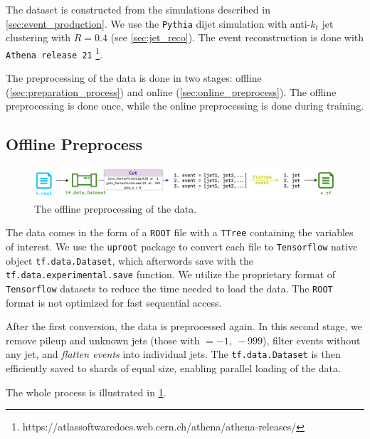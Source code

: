 The dataset is constructed from the \MC simulations described in \cref{sec:event_production}.
We use the \texttt{Pythia} dijet \MC simulation with anti-$k_t$ jet clustering with $R = 0.4$ (see \cref{sec:jet_reco}). 
The event reconstruction is done with \texttt{Athena release 21} \footnote{https://atlassoftwaredocs.web.cern.ch/athena/athena-releases/}.

The preprocessing of the data is done in two stages: offline (\cref{sec:preparation_process}) and online (\cref{sec:online_preprocess}).
The offline preprocessing is done once, while the online preprocessing is done during training.

\subsection{Offline Preprocess}
\begin{figure}[!ht]
    \centering
    \includegraphics[width=1.\textwidth]{src/diagrams/data_prep_off.png}
    \caption{The offline preprocessing of the data.}
    \label{fig:data_prep_off}
\end{figure}
\label{sec:preparation_process}
The data comes in the form of a \texttt{ROOT} \cite{root} file with a \texttt{TTree} containing the variables of interest.
We use the \texttt{uproot} \cite{uproot} package to convert each file to \texttt{Tensorflow} \cite{tf} native object \texttt{tf.data.Dataset}\footnotemark, which afterwords save with the \texttt{tf.data.experimental.save} function.
We utilize the proprietary format of \texttt{Tensorflow} datasets to reduce the time needed to load the data.
The \texttt{ROOT} format is not optimized for fast sequential access. 

After the first conversion, the data is preprocessed again.
In this second stage, we remove pileup and unknown jets (those with \PID $= -1,\ -999$), filter events without any jet, and \emph{flatten events} into individual jets.
The \texttt{tf.data.Dataset} is then efficiently saved to shards of equal size, enabling parallel loading of the data.

The whole process is illustrated in \cref{fig:data_prep_off}.


